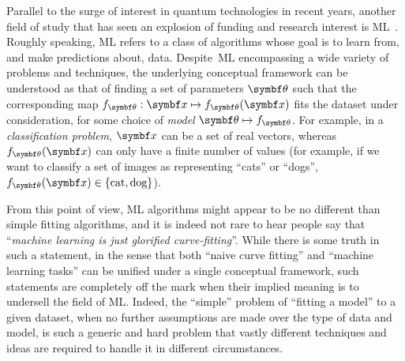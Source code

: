 Parallel to the surge of interest in quantum technologies in recent years, another field of study that has seen an explosion of funding and research interest is \ac{ML}~\cite{you2011atomic,bishop2006pattern,abu2012learning,friedman2001elements,murphy2012machine,mehta2019highbias}.
Roughly speaking, \ac{ML} refers to a class of algorithms whose goal is to learn from, and make predictions about, data.
Despite~\ac{ML} encompassing a wide variety of problems and techniques, the underlying conceptual framework can be understood as that of finding a set of parameters $\bstheta$ such that the corresponding map $f_\bstheta:\bs x\mapsto f_\bstheta(\bs x)$ fits the dataset under consideration, for some choice of \emph{model} $\bstheta\mapsto f_\bstheta$.
For example, in a \emph{classification problem}, $\bs x$ can be a set of real vectors, whereas $f_\bstheta(\bs x)$ can only have a finite number of values (for example, if we want to classify a set of images as representing ``cats'' or ``dogs'', $f_\bstheta(\bs x)\in\{\text{cat},\text{dog}\}$).

From this point of view, \ac{ML} algorithms might appear to be no different than simple fitting algorithms, and it is indeed not rare to hear people say that ``\emph{machine learning is just glorified curve-fitting}''. While there is some truth in such a statement, in the sense that both ``naive curve fitting'' and ``machine learning tasks'' can be unified under a single conceptual framework, such statements are completely off the mark when their implied meaning is to undersell the field of \ac{ML}.
Indeed, the ``simple'' problem of ``fitting a model'' to a given dataset, when no further assumptions are made over the type of data and model, is such a generic and hard problem that vastly different techniques and ideas are required to handle it in different circumstances.


\cite{carleo2019machine}

